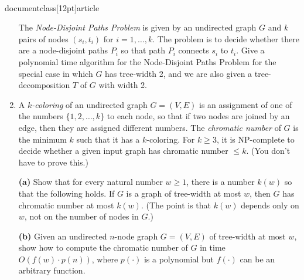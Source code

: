 \\documentclass[12pt]{article}
\begin{document}
\begin{enumerate}
The {\em Node-Disjoint Paths Problem} is given by an undirected graph $G$ 
and $k$ pairs of nodes $(s_i, t_i)$ for
$i=1,\ldots,k$. The problem is to decide whether there are a node-disjoint
paths $P_i$ so that path $P_i$ connects $s_i$ to $t_i$.
Give a polynomial time algorithm for the Node-Disjoint Paths Problem
for the special case in which $G$ has tree-width 2, and we are also given
a tree-decomposition $T$ of $G$ with width 2.


\item 

A {\em $k$-coloring} of an undirected graph $G = (V,E)$
is an assignment of one of the numbers $\{1, 2, \ldots, k\}$
to each node, so that if two nodes are joined by an edge,
then they are assigned different numbers.
The {\em chromatic number} of $G$ is the minimum $k$
such that it has a $k$-coloring.
For $k \geq 3$, it is NP-complete to decide whether
a given input graph has chromatic number $\leq k$.
(You don't have to prove this.)

\medskip
{\bf (a)} Show that for every natural number $w \geq 1$,
there is a number $k(w)$ so that the following holds.
If $G$ is a graph of tree-width at most $w$,
then $G$ has chromatic number at most $k(w)$.
(The point is that $k(w)$ depends only on $w$,
not on the number of nodes in $G$.)

\medskip
{\bf (b)} Given an undirected $n$-node graph $G = (V,E)$
of tree-width at most $w$, show how to compute
the chromatic number of $G$ in time $O(f(w) \cdot p(n))$,
where $p(\cdot)$ is a polynomial but
$f(\cdot)$ can be an arbitrary function.


\end{enumerate}
\end{document}
